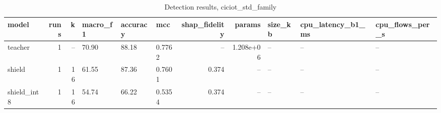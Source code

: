 \begin{table}
\caption{Detection results, ciciot_std_family}
\begin{tabular}{lrrlllrrlll}
\toprule
model & runs & k & macro_f1 & accuracy & mcc & shap_fidelity & params & size_kb & cpu_latency_b1_ms & cpu_flows_per_s \\
\midrule
teacher & 1 & -- & 70.90 & 88.18 & 0.7762 & -- & 1.208e+06 & -- & -- & -- \\
shield & 1 & 16 & 61.55 & 87.36 & 0.7601 & 0.374 & -- & -- & -- & -- \\
shield_int8 & 1 & 16 & 54.74 & 66.22 & 0.5354 & 0.374 & -- & -- & -- & -- \\
\bottomrule
\end{tabular}
\end{table}

